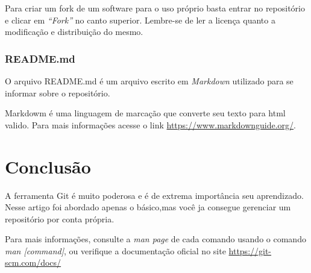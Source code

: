 \documentclass[]{article}
\begin{document}
Para criar um fork de um software para o uso próprio basta entrar no repositório e clicar em \textit{``Fork''} no canto superior.
Lembre-se de ler a licença quanto a modificação e distribuição do mesmo.

\subsubsection*{README.md}

O arquivo README.md é um arquivo escrito em \textit{Markdown} utilizado para se informar sobre o repositório.

Markdowm é uma linguagem de marcação que converte seu texto para html valido. 
Para mais informações acesse o link \url{https://www.markdownguide.org/}.
\section{Conclusão}
A ferramenta Git é muito poderosa e é de extrema importância seu aprendizado.
Nesse artigo foi abordado apenas o básico,mas você ja consegue gerenciar um repositório por conta própria.

Para mais informações, consulte  a \textit{man page} de cada comando usando o comando \textit{man [command]}, 
ou  verifique a documentação oficial no site \url{https://git-scm.com/docs/}
\end{document}

